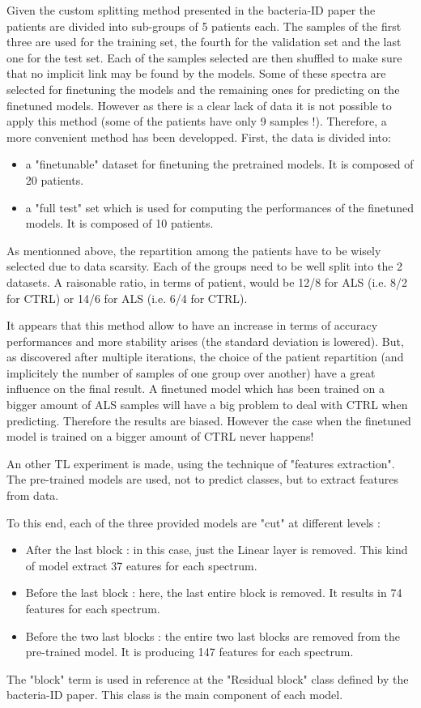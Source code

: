 Given the custom splitting method presented in the bacteria-ID paper\cite{bacteria-ID} the patients are divided into sub-groups of 5 patients each. The samples of the first three are used for the training set, the fourth for the validation set and the last one for the test set. Each of the samples selected are then shuffled to make sure that no implicit link may be found by the models. Some of these spectra are selected for finetuning the models and the remaining ones for predicting on the finetuned models.
However as there is a clear lack of data it is not possible to apply this method (some of the patients have only 9 samples !).
Therefore, a more convenient method has been developped. First, the data is divided into:
\begin{itemize}
\item a "finetunable" dataset for finetuning the pretrained models. It is composed of 20 patients.
\item a "full test" set which is used for computing the performances of the finetuned models. It is composed of 10 patients.
\end{itemize}  
As mentionned above, the repartition among the patients have to be wisely selected due to data scarsity. Each of the groups need to be well split into the 2 datasets. 
A raisonable ratio, in terms of patient, would be 12/8 for ALS (i.e. 8/2 for CTRL) or 14/6 for ALS (i.e. 6/4 for CTRL). 

It appears that this method allow to have an increase in terms of accuracy performances and more stability arises (the standard deviation is lowered). But, as discovered after multiple iterations, the choice of the patient repartition (and implicitely the number of samples of one group over another) have a great influence on the final result.
A finetuned model which has been trained on a bigger amount of ALS samples will have a big problem to deal with CTRL when predicting. Therefore the results are biased. 
However the case when the finetuned model is trained on a bigger amount of CTRL never happens!

An other TL experiment is made, using the technique of "features extraction". The pre-trained models are used, not to predict classes, but to extract features from data. 

To this end, each of the three provided models are "cut" at different levels :
\begin{itemize}
\item After the last block : in this case, just the Linear layer is removed. This kind of model extract 37 eatures for each spectrum.
\item Before the last block : here, the last entire block is removed. It results in 74 features for each spectrum.
\item Before the two last blocks : the entire two last blocks are removed from the pre-trained model. It is producing 147 features for each spectrum.
\end{itemize}
The "block" term is used in reference at the "Residual block" class defined by the bacteria-ID paper. This class is the main component of each model.

